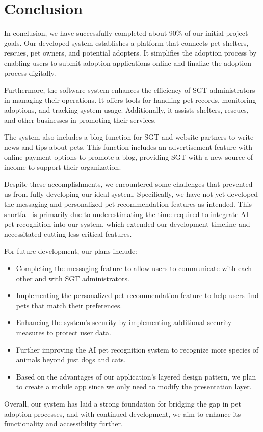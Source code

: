 \chapter{Conclusion}

In conclusion, we have successfully completed about 90\% of our initial project goals. Our developed system establishes a platform that connects pet shelters, rescues, pet owners, and potential adopters. It simplifies the adoption process by enabling users to submit adoption applications online and finalize the adoption process digitally.

Furthermore, the software system enhances the efficiency of SGT administrators in managing their operations. It offers tools for handling pet records, monitoring adoptions, and tracking system usage. Additionally, it assists shelters, rescues, and other businesses in promoting their services.

The system also includes a blog function for SGT and website partners to write news and tips about pets. This function includes an advertisement feature with online payment options to promote a blog, providing SGT with a new source of income to support their organization.

Despite these accomplishments, we encountered some challenges that prevented us from fully developing our ideal system. Specifically, we have not yet developed the messaging and personalized pet recommendation features as intended. This shortfall is primarily due to underestimating the time required to integrate AI pet recognition into our system, which extended our development timeline and necessitated cutting less critical features.

For future development, our plans include:

\begin{itemize}
    \item Completing the messaging feature to allow users to communicate with each other and with SGT administrators.
    \item Implementing the personalized pet recommendation feature to help users find pets that match their preferences.
    \item Enhancing the system's security by implementing additional security measures to protect user data.
    \item Further improving the AI pet recognition system to recognize more species of animals beyond just dogs and cats.
    \item Based on the advantages of our application's layered design pattern, we plan to create a mobile app since we only need to modify the presentation layer.
\end{itemize}

Overall, our system has laid a strong foundation for bridging the gap in pet adoption processes, and with continued development, we aim to enhance its functionality and accessibility further.